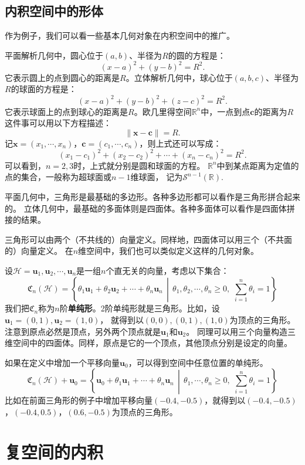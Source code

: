 \documentclass[12pt,UTF8,fontset=none]{ctexbook}
\begin{document}
\subsection{内积空间中的形体}
作为例子，我们可以看一些基本几何对象在内积空间中的推广。

平面解析几何中，圆心位于$(a,b)$、半径为$R$的圆的方程是：
$$ (x - a)^2 + (y - b)^2 = R^2.$$
它表示圆上的点到圆心的距离是$R$。立体解析几何中，球心位于$(a,b,c)$、半径为$R$的球面的方程是：
$$ (x - a)^2 + (y - b)^2 + (z - c)^2= R^2.$$
它表示球面上的点到球心的距离是$R$。欧几里得空间$\mathbb{R}^n$中，一点到点$\mathbf{c}$的距离为$R$这件事可以用以下方程描述：
$$ \| \mathbf{x} - \mathbf{c}\| = R. $$
记$\mathbf{x} = (x_1, \cdots , x_n)$，$\mathbf{c} = (c_1, \cdots , c_n)$，则上式还可以写成：
$$ (x_1 - c_1)^2 + (x_2 - c_2)^2 + \cdots + (x_n - c_n)^2 = R^2.$$
可以看到，$n=2,3$时，上式就分别是圆和球面的方程。
$\mathbb{R}^n$中到某点距离为定值的点的集合，一般称为超球面或$n-1$维球面，
记为$\mathcal{S}^{n-1}(\mathbb{R})$.

平面几何中，三角形是最基础的多边形。各种多边形都可以看作是三角形拼合起来的。
立体几何中，最基础的多面体则是四面体。各种多面体可以看作是四面体拼接的结果。

三角形可以由两个（不共线的）向量定义。同样地，四面体可以用三个（不共面的）向量定义。
在$n$维空间中，我们也可以类似定义这样的几何对象。

设$\mathcal{H} = \mathbf{u}_1, \mathbf{u}_2, \cdots , \mathbf{u}_n$是一组$n$个直无关的向量，考虑以下集合：
$$ \mathfrak{C}_n (\mathcal{H}) = \left\{ \theta_1\mathbf{u}_1 + \theta_2\mathbf{u}_2 + \cdots + \theta_n\mathbf{u}_n \, \middle\vert \, \theta_1, \theta_2, \cdots, \theta_n \geqslant 0, \,\, \sum_{i=1}^n \theta_i = 1 \right\}$$
我们把$\mathfrak{C}_n$称为$n$阶\textbf{单纯形}。2阶单纯形就是三角形。比如，设$\mathbf{u}_1 =(0,1), \mathbf{u}_2 = (1,0)$，
就得到以$(0,0), (0,1), (1,0)$为顶点的三角形。注意到原点必然是顶点，另外两个顶点就是$\mathbf{u}_1$和$\mathbf{u}_2$。
同理可以用三个向量构造三维空间中的四面体。同样，原点是它的一个顶点，其他顶点分别是设定的向量。

如果在定义中增加一个平移向量$\mathbf{u}_0$，可以得到空间中任意位置的单纯形。
$$ \mathfrak{C}_n (\mathcal{H}) + \mathbf{u}_0 = \left\{ \mathbf{u}_0 + \theta_1\mathbf{u}_1 +  \cdots + \theta_n\mathbf{u}_n \, \middle\vert \, \theta_1,  \cdots, \theta_n \geqslant 0, \,\, \sum_{i=1}^n \theta_i = 1 \right\}$$
比如在前面三角形的例子中增加平移向量$(-0.4, -0.5)$，就得到以$(-0.4, -0.5)$，$(-0.4, 0.5)$，$(0.6, -0.5)$为顶点的三角形。

\section{复空间的内积}
\end{document}
